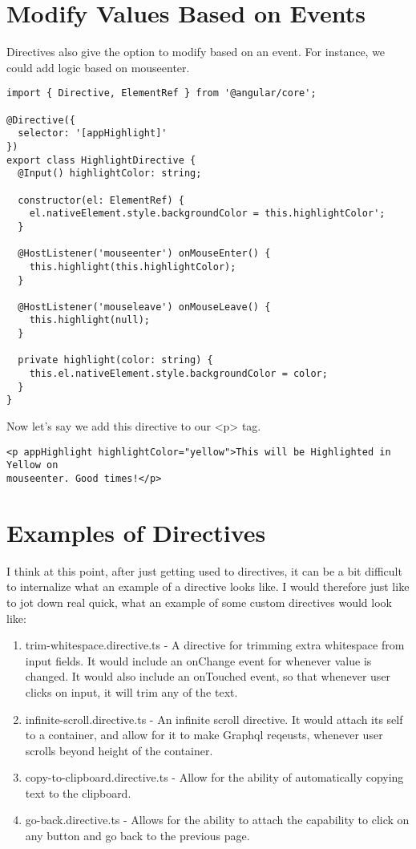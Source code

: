 \section{ Modify Values Based on Events }
Directives also give the option to modify based on an event. For instance,
we could add logic based on mouseenter.

\begin{lstlisting}
import { Directive, ElementRef } from '@angular/core';

@Directive({
  selector: '[appHighlight]'
})
export class HighlightDirective {
  @Input() highlightColor: string;

  constructor(el: ElementRef) {
    el.nativeElement.style.backgroundColor = this.highlightColor';
  }

  @HostListener('mouseenter') onMouseEnter() {
    this.highlight(this.highlightColor);
  }

  @HostListener('mouseleave') onMouseLeave() {
    this.highlight(null);
  }

  private highlight(color: string) {
    this.el.nativeElement.style.backgroundColor = color;
  }
}
\end{lstlisting}

Now let's say we add this directive to our <p> tag.

\begin{lstlisting}
<p appHighlight highlightColor="yellow">This will be Highlighted in Yellow on
mouseenter. Good times!</p>
\end{lstlisting}

\section{ Examples of Directives }
I think at this point, after just getting used to directives, it can be a bit
difficult to internalize what an example of a directive looks like. I would
therefore just like to jot down real quick, what an example of some custom
directives would look like:
\begin{enumerate}
  \item trim-whitespace.directive.ts - A directive for trimming extra whitespace
  from input fields. It would include an onChange event for whenever value is
  changed. It would also include an onTouched event, so that whenever user
  clicks on input, it will trim any of the text.
  \item infinite-scroll.directive.ts - An infinite scroll directive. It would
  attach its self to a container, and allow for it to make Graphql reqeusts,
  whenever user scrolls beyond height of the container.
  \item copy-to-clipboard.directive.ts - Allow for the ability of automatically
  copying text to the clipboard.
  \item go-back.directive.ts - Allows for the ability to attach the capability
  to click on any button and go back to the previous page.
\end{enumerate}
